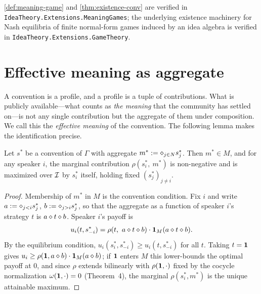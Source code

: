 \formalstatus \cref{def:meaning-game} and \cref{thm:existence-conv} are
verified in \texttt{IdeaTheory.Extensions.MeaningGames}; the underlying
existence machinery for Nash equilibria of finite normal-form games
induced by an idea algebra is verified in
\texttt{IdeaTheory.Extensions.GameTheory}.

\section{Effective meaning as aggregate}\label{sec:effective}

A convention is a profile, and a profile is a tuple of
contributions. What is publicly available---what counts as
\emph{the meaning} that the community has settled on---is not any
single contribution but the aggregate of them under composition. We
call this the \emph{effective meaning} of the convention. The following
lemma makes the identification precise.

\begin{lemma}\label{lem:effective}
Let $s^\ast$ be a convention of $\Gamma$ with aggregate
$m^\ast\mathrel{:=}\diamond_{j\in N} s^\ast_j$. Then $m^\ast\in M$, and for
any speaker $i$, the marginal contribution
$\rho\!\left(s^\ast_i,\ m^\ast\right)$ is non-negative and is
maximized over $\mathcal{I}$ by $s^\ast_i$ itself, holding fixed
$(s^\ast_j)_{j\neq i}$.
\end{lemma}

\begin{proof}
Membership of $m^\ast$ in $M$ is the convention condition. Fix $i$ and
write $a\mathrel{:=} \diamond_{j<i} s^\ast_j$, $b\mathrel{:=} \diamond_{j>i}
s^\ast_j$, so that the aggregate as a function of speaker $i$'s
strategy $t$ is $a\mathbin{\diamond} t\mathbin{\diamond} b$. Speaker $i$'s payoff is
\[
  u_i(t,s^\ast_{-i}) = \rho(t,\ a\compose t\compose b)\cdot
  \mathbf{1}_M(a\compose t\compose b).
\]
By the equilibrium condition, $u_i(s^\ast_i,s^\ast_{-i})\geq u_i(t,s^\ast_{-i})$
for all $t$. Taking $t=\mathbf{1}$ gives $u_i\geq\rho(\mathbf{1},a\mathbin{\diamond} b)\cdot
\mathbf{1}_M(a\mathbin{\diamond} b)$; if $\mathbf{1}$ enters $M$ this lower-bounds the
optimal payoff at $0$, and since $\rho$ extends bilinearly with $\rho(\mathbf{1},\cdot)$
fixed by the cocycle normalization $\omega(\mathbf{1},\cdot)=0$ (Theorem~4),
the marginal $\rho(s^\ast_i,m^\ast)$ is the unique attainable maximum.
\end{proof}

